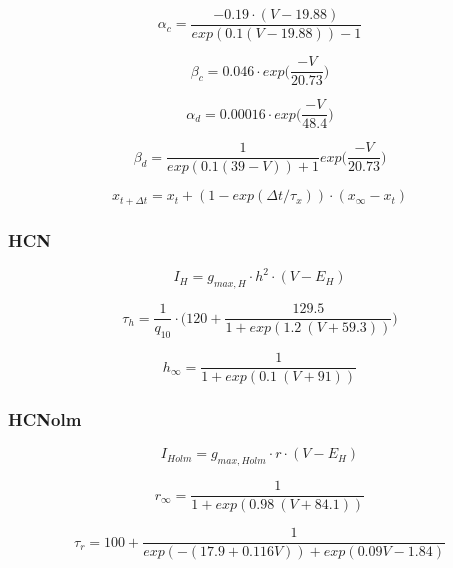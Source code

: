 \documentclass[12pt]{article}
\begin{document}
\begin{equation}
\alpha_{c} = \frac{-0.19 \cdot (V - 19.88)}{exp(0.1(V - 19.88)) - 1}
\end{equation}

\begin{equation}
\beta_{c} = 0.046 \cdot exp \Big(\frac{-V}{20.73}\Big)
\end{equation}

\begin{equation}
\alpha_{d} = 0.00016 \cdot exp \Big(\frac{-V}{48.4}\Big)
\end{equation}

\begin{equation}
\beta_{d} = \frac{1}{exp(0.1(39 - V)) + 1} exp \Big(\frac{-V}{20.73}\Big)
\end{equation}


\begin{equation}
x_{t+\Delta t} = x_{t} + (1 - exp(\Delta t / \tau_x)  ) \cdot (x_{\infty} - x_t)
\end{equation}

\subsubsection{HCN}
\begin{equation}
I_{H} = g_{max, H} \cdot h^2 \cdot (V - E_{H})
\end{equation}

\begin{equation}
\tau_{h} = \frac{1}{q_{10}} \cdot \Bigg(120 + \frac{129.5}{1 + exp(1.2 \ (V + 59.3))} \Bigg)
\end{equation}

\begin{equation}
h_{\infty} =  \frac{1}{1 + exp(0.1 \ (V + 91))}
\end{equation}

\subsubsection{HCNolm}
\begin{equation}
I_{Holm} = g_{max, Holm} \cdot r \cdot (V - E_{H})
\end{equation}

\begin{equation}
r_{\infty} =  \frac{1}{1 + exp(0.98 \ (V + 84.1))}
\end{equation}

\begin{equation}
\tau_{r} = 100 + \frac{1}{exp(-(17.9+0.116V)) + exp(0.09V-1.84)   }
\end{equation}
\end{document}
